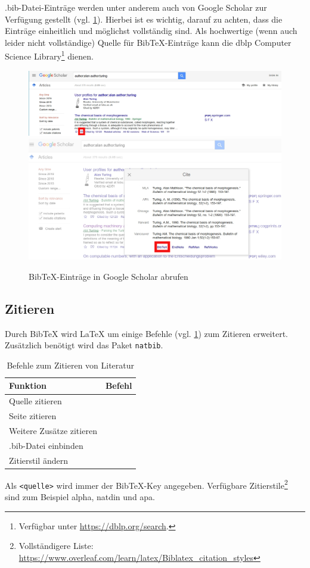 .bib-Datei-Einträge werden unter anderem auch von Google Scholar zur Verfügung gestellt (vgl. \cref{fig:google-scholar-bibtex}).
Hierbei ist es wichtig, darauf zu achten, dass die Einträge einheitlich und möglichst vollständig sind.
Als hochwertige (wenn auch leider nicht vollständige) Quelle für BibTeX-Einträge kann die dblp Computer Science Library\footnote{Verfügbar unter \url{https://dblp.org/search}.} dienen.

\begin{figure}[H]
  \includegraphics[width=\textwidth]{graphics/google_bibtex1.jpg}  
  \includegraphics[width=\textwidth]{graphics/google_bibtex2.jpg}  
  \caption{BibTeX-Einträge in Google Scholar abrufen}
  \label{fig:google-scholar-bibtex}
\end{figure}

\subsection{Zitieren}
Durch BibTeX wird LaTeX um einige Befehle (vgl. \cref{tab:bibtex-commands}) zum Zitieren erweitert. 
Zusätzlich benötigt wird das Paket \texttt{natbib}.

\begin{table}[H]
  \centering
  \begin{tabular}{ll}
  \toprule
  Funktion                 & Befehl \\ \midrule
  Quelle zitieren          & \texttt{\cite{<quelle>}} \\
  Seite zitieren           & \texttt{\cite[S. 15]{<quelle>}} \\
  Weitere Zusätze zitieren & \texttt{\cite[<präfix>][<suffix>]{<quelle>}} \\
  .bib-Datei einbinden     & \texttt{} \\
  Zitierstil ändern        & \texttt{} \\ \bottomrule
  \end{tabular}
  \caption{Befehle zum Zitieren von Literatur}
  \label{tab:bibtex-commands}
\end{table}

Als \texttt{<quelle>} wird immer der BibTeX-Key angegeben.
Verfügbare Zitierstile\footnote{Vollständigere Liste: \url{https://www.overleaf.com/learn/latex/Biblatex_citation_styles}} sind zum Beispiel alpha, natdin und apa.
